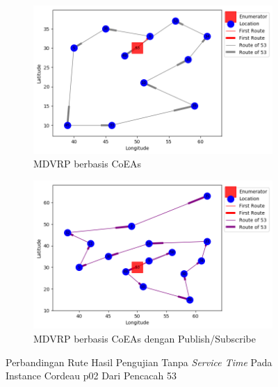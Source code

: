 \begin{figure}[H]
	\centering
	\begin{subfigure}[t]{\textwidth}
		\centering
		\includegraphics[width=\textwidth]{Resources/Images/cordeau_p02/cordeau_p02_notw_53_coes}
		\caption{MDVRP berbasis CoEAs}
		\label{fig:cordeau_p02_notw_53_coes}
	\end{subfigure}
	\begin{subfigure}[t]{\textwidth}
		\centering
		\includegraphics[width=\textwidth]{Resources/Images/cordeau_p02/cordeau_p02_notw_53_pubsub_coes}
		\caption{MDVRP berbasis CoEAs dengan Publish/Subscribe}
		\label{fig:cordeau_p02_notw_53_pubsub_coes}
	\end{subfigure}
	\caption{Perbandingan Rute Hasil Pengujian Tanpa \textit{Service Time} Pada Instance Cordeau p02 Dari Pencacah 53}
	\label{fig:cordeau_p02_notw_53}
\end{figure}



